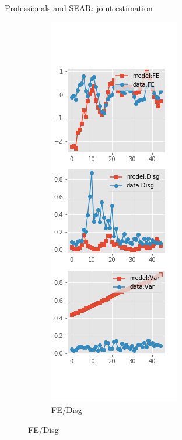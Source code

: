 \documentclass{beamer}
\begin{document}
\begin{frame}{Professionals and SEAR: joint estimation}
\begin{figure}[ht]
\begin{subfigure}[b]{0.2\textwidth}
		\end{subfigure}
		\hfill
		\begin{subfigure}[b]{0.2\textwidth}
			\caption{FE/Disg}
			\includegraphics[width=\textwidth, height = 0.8\textheight]{figuresDraft/spf_se_est_joint_diag2.png}

\end{subfigure}
\end{figure}
\end{frame}
\end{document}
